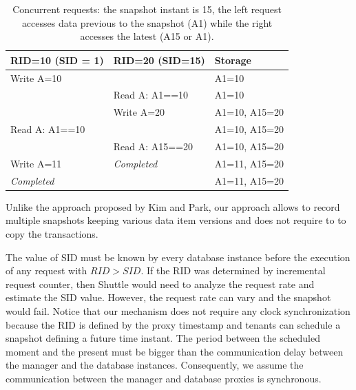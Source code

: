 \begin{table}
\centering
\begin{tabular}{l|l|l}
\textbf{RID=10 (SID = 1)}     & \textbf{RID=20 (SID=15)}   & \textbf{Storage}\\ \hline
Write A=10                    & ~                          & A1=10  \\
~                             & Read A: A1==10             & A1=10  \\         
~                             & Write A=20                 & A1=10, A15=20 \\
Read A: A1==10                & ~                          & A1=10, A15=20 \\
~                             & Read A: A15==20            & A1=10, A15=20 \\
Write A=11                    & \textit{Completed}         & A1=11, A15=20 \\
\textit{Completed}            & ~                          & A1=11, A15=20 \\
\end{tabular}
\caption[Concurrent requests]{Concurrent requests: the snapshot instant is 15, the left request accesses data previous to the snapshot (A1) while the right accesses the latest (A15 or A1). }
\label{tab:snapshot_caso_bicudo}
\end{table}


Unlike the approach proposed by Kim and Park, our approach allows to record multiple snapshots keeping various data item versions and does not require to to copy the transactions.

The value of \acf{SID} must be known by every database instance before the execution of any request with $RID > SID$. If the \ac{RID} was determined by incremental request counter, then Shuttle would need to analyze the request rate and estimate the \ac{SID} value. However, the request rate can vary and the snapshot would fail. Notice that our mechanism does not require any clock synchronization because the \ac{RID} is defined by the proxy timestamp and tenants can schedule a snapshot defining a future time instant. The period between the scheduled moment and the present must be bigger than the communication delay between the manager and the database instances. Consequently, we assume the communication between the manager and database proxies is synchronous. 


